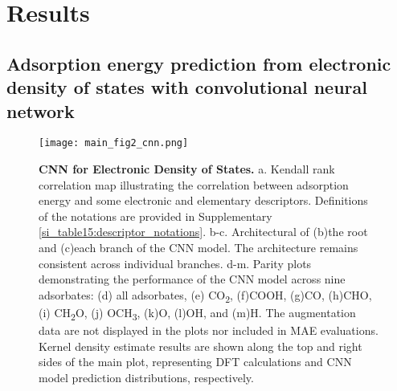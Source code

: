 
\section{Results}

\subsection{Adsorption energy prediction from electronic density of states with convolutional neural network}

\begin{figure}[htbp]
    \centering
    \texttt{[image: main\_fig2\_cnn.png]}
    \caption{\textbf{CNN for Electronic Density of States.}
    a. Kendall rank correlation map illustrating the correlation between adsorption energy
    and some electronic and elementary descriptors.
    Definitions of the notations are provided in Supplementary \cref{si_table15:descriptor_notations}.
    b-c. Architectural of (b)the root and (c)each branch of the CNN model.
    The architecture remains consistent across individual branches.
    d-m. Parity plots demonstrating the performance of the CNN model across nine adsorbates:
    (d) all adsorbates, (e) CO\textsubscript{2}, (f)COOH, (g)CO, (h)CHO,
    (i) CH\textsubscript{2}O, (j) OCH\textsubscript{3}, (k)O, (l)OH, and (m)H.
    The augmentation data are not displayed in the plots nor included in MAE evaluations.
    Kernel density estimate results are shown along the top and right sides of the main plot,
    representing DFT calculations and CNN model prediction distributions, respectively.}
    \label{main_fig2:cnn_for_eads}
\end{figure}

